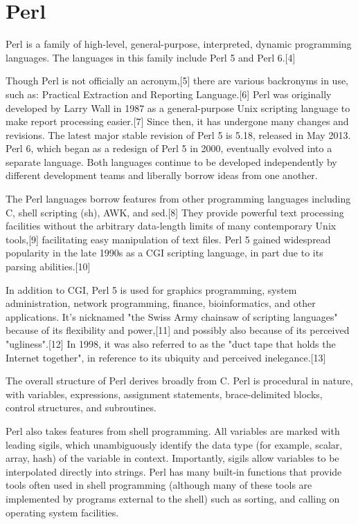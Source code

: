 \newpage
\section{Perl}
Perl is a family of high-level, general-purpose, interpreted, dynamic programming languages. The languages in this family include Perl 5 and Perl 6.[4]

\vpara
Though Perl is not officially an acronym,[5] there are various backronyms in use, such as: Practical Extraction and Reporting Language.[6] Perl was originally developed by Larry Wall in 1987 as a general-purpose Unix scripting language to make report processing easier.[7] Since then, it has undergone many changes and revisions. The latest major stable revision of Perl 5 is 5.18, released in May 2013. Perl 6, which began as a redesign of Perl 5 in 2000, eventually evolved into a separate language. Both languages continue to be developed independently by different development teams and liberally borrow ideas from one another.

\vpara
The Perl languages borrow features from other programming languages including C, shell scripting (sh), AWK, and sed.[8] They provide powerful text processing facilities without the arbitrary data-length limits of many contemporary Unix tools,[9] facilitating easy manipulation of text files. Perl 5 gained widespread popularity in the late 1990s as a CGI scripting language, in part due to its parsing abilities.[10]

\vpara
In addition to CGI, Perl 5 is used for graphics programming, system administration, network programming, finance, bioinformatics, and other applications. It's nicknamed "the Swiss Army chainsaw of scripting languages" because of its flexibility and power,[11] and possibly also because of its perceived "ugliness".[12] In 1998, it was also referred to as the "duct tape that holds the Internet together", in reference to its ubiquity and perceived inelegance.[13]

\vpara
The overall structure of Perl derives broadly from C. Perl is procedural in nature, with variables, expressions, assignment statements, brace-delimited blocks, control structures, and subroutines.

\vpara
Perl also takes features from shell programming. All variables are marked with leading sigils, which unambiguously identify the data type (for example, scalar, array, hash) of the variable in context. Importantly, sigils allow variables to be interpolated directly into strings. Perl has many built-in functions that provide tools often used in shell programming (although many of these tools are implemented by programs external to the shell) such as sorting, and calling on operating system facilities.

